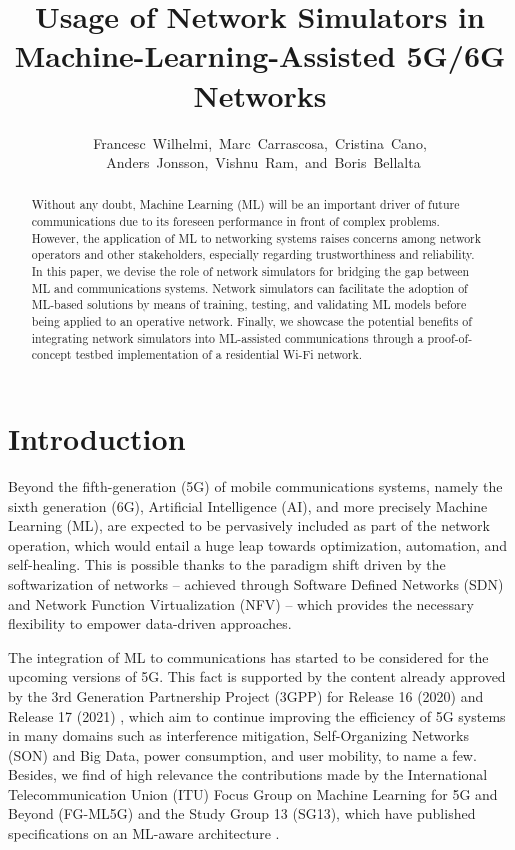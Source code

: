 \documentclass{article}
\begin{document}
		\setcounter{page}{173}
	\title{Usage of Network Simulators in \\Machine-Learning-Assisted 5G/6G Networks}
	\author{Francesc~Wilhelmi,~Marc~Carrascosa,~Cristina~Cano,\\~Anders~Jonsson,~Vishnu~Ram,~and~Boris~Bellalta}
	\date{ }
	\maketitle
	
	\begin{abstract}
		Without any doubt, Machine Learning (ML) will be an important driver of future communications due to its foreseen performance in front of complex problems. However, the application of ML to networking systems raises concerns among network operators and other stakeholders, especially regarding trustworthiness and reliability. In this paper, we devise the role of network simulators for bridging the gap between ML and communications systems. Network simulators can facilitate the adoption of ML-based solutions by means of training, testing, and validating ML models before being applied to an operative network. Finally, we showcase the potential benefits of integrating network simulators into ML-assisted communications through a proof-of-concept testbed implementation of a residential Wi-Fi network. 
	\end{abstract}
	
	\section{Introduction}
	Beyond the fifth-generation (5G) of mobile communications systems, namely the sixth generation (6G), Artificial Intelligence (AI), and more precisely Machine Learning (ML), are expected to be pervasively included as part of the network operation, which would entail a huge leap towards optimization, automation, and self-healing. This is possible thanks to the paradigm shift driven by the softwarization of networks -- achieved through Software Defined Networks (SDN) and Network Function Virtualization (NFV) -- which provides the necessary flexibility to empower data-driven approaches.
	
	The integration of ML to communications has started to be considered for the upcoming versions of 5G. This fact is supported by the content already approved by the 3rd Generation Partnership Project (3GPP) for Release 16 (2020) and Release 17 (2021) \cite{3gpp2019study}, which aim to continue improving the efficiency of 5G systems in many domains such as interference mitigation, Self-Organizing Networks (SON) and Big Data, power consumption, and user mobility, to name a few. Besides, we find of high relevance the contributions made by the International Telecommunication Union (ITU) Focus Group on Machine Learning for 5G and Beyond (FG-ML5G) and the Study Group 13 (SG13), which have published specifications on an ML-aware architecture \cite{ITU3172, ITU3174}.
	
\end{document}
